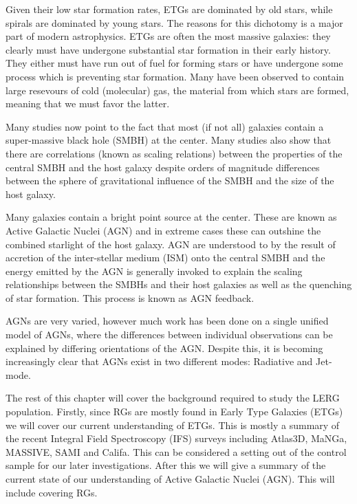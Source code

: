 Given their low star formation rates, ETGs are dominated by old stars, while spirals are dominated by young stars. The reasons for this dichotomy is a major part of modern astrophysics. ETGs are often the most massive galaxies: they clearly must have undergone substantial star formation in their early history. They either must have run out of fuel for forming stars or have undergone some process which is preventing star formation. Many have been observed to contain large resevours of cold (molecular) gas, the material from which stars are formed, meaning that we must favor the latter. 

Many studies now point to the fact that most (if not all) galaxies contain a super-massive black hole (SMBH) at the center. Many studies also show that there are correlations (known as scaling relations) between the properties of the central SMBH and the host galaxy despite orders of magnitude differences between the sphere of gravitational influence of the SMBH and the size of the host galaxy. 

Many galaxies contain a bright point source at the center. These are known as Active Galactic Nuclei (AGN) and in extreme cases these can outshine the combined starlight of the host galaxy. AGN are understood to by the result of accretion of the inter-stellar medium (ISM) onto the central SMBH and the energy emitted by the AGN is generally invoked to explain the scaling relationships between the SMBHs and their host galaxies as well as the quenching of star formation. This process is known as AGN feedback. 

AGNs are very varied, however much work has been done on a single unified model of AGNs, where the differences between individual observations can be explained by differing orientations of the AGN. Despite this, it is becoming increasingly clear that AGNs exist in two different modes: Radiative and Jet-mode. 










The rest of this chapter will cover the background required to study the LERG population. Firstly, since RGs are mostly found in Early Type Galaxies (ETGs) we will cover our current understanding of ETGs. This is mostly a summary of the recent Integral Field Spectroscopy (IFS) surveys including Atlas3D, MaNGa, MASSIVE, SAMI and Califa. This can be considered a setting out of the control sample for our later investigations. After this we will give a summary of the current state of our understanding of Active Galactic Nuclei (AGN). This will include covering RGs.

